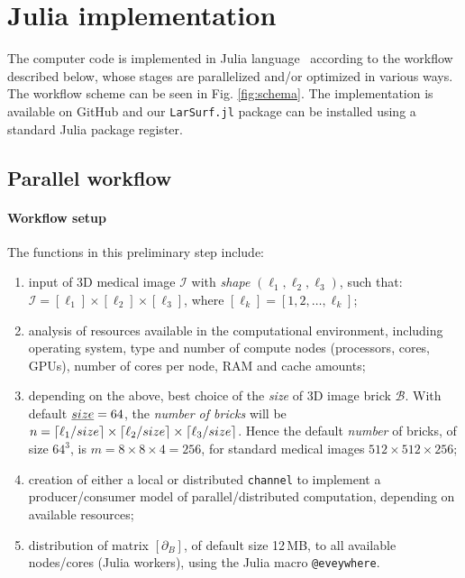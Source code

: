 
\section{Julia implementation}\label{sec:julia}

The computer code is implemented in Julia language~\cite{BEKS14} according to the workflow described below, whose stages are parallelized and/or optimized in various ways. The workflow scheme can be seen in Fig. \ref{fig:schema}. The implementation is available on GitHub \cite{larsurf-github} and our \texttt{LarSurf.jl} package can be installed using a standard Julia package register.

\subsection{Parallel workflow}\label{sec:implementation}


\paragraph{Workflow setup}\label{sec:workflow}
The functions in this preliminary step include:
\begin{enumerate}

\item input of 3D medical image $\mathcal{I}$ with \emph{shape} $(\ell_1, \ell_2, \ell_3)$, such that: $\mathcal{I} = [\ell_1]\times[\ell_2]\times[\ell_3]$, where $[\ell_k] = [1,2,\ldots,\ell_k]$;

\item analysis of resources available in the computational environment, including operating system, type and number of compute nodes (processors, cores, GPUs), number of cores per node, RAM and cache amounts;

\item depending on the above, best choice of the \emph{size} of 3D image brick $\mathcal{B}$. With default $\emph{size}=64$,  the \emph{number of bricks} will be $n=\left\lceil \ell_1/size \right\rceil\times\left\lceil \ell_2/size \right\rceil\times\left\lceil \ell_3/size \right\rceil$. 
Hence the default \emph{number} of bricks, of size $64^3$, is $m=8\times 8\times 4 = 256$, for standard medical images $512\times 512\times 256$;


\item creation of either a local or distributed \texttt{channel} to implement a producer/consumer model of parallel/distributed computation, depending on available resources;

\item distribution of matrix $[\partial_B]$, of default size 12\,MB, to all available nodes/cores (Julia workers), using the Julia macro \texttt{@eveywhere}. 

\end{enumerate}

